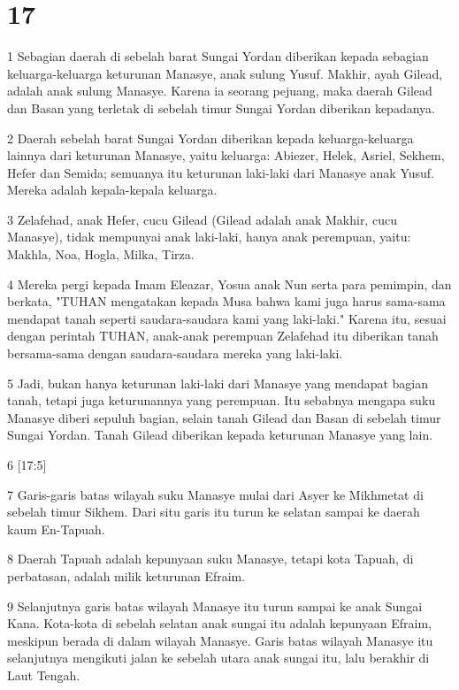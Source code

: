 \chapter{17}

\par 1 Sebagian daerah di sebelah barat Sungai Yordan diberikan kepada sebagian keluarga-keluarga keturunan Manasye, anak sulung Yusuf. Makhir, ayah Gilead, adalah anak sulung Manasye. Karena ia seorang pejuang, maka daerah Gilead dan Basan yang terletak di sebelah timur Sungai Yordan diberikan kepadanya.
\par 2 Daerah sebelah barat Sungai Yordan diberikan kepada keluarga-keluarga lainnya dari keturunan Manasye, yaitu keluarga: Abiezer, Helek, Asriel, Sekhem, Hefer dan Semida; semuanya itu keturunan laki-laki dari Manasye anak Yusuf. Mereka adalah kepala-kepala keluarga.
\par 3 Zelafehad, anak Hefer, cucu Gilead (Gilead adalah anak Makhir, cucu Manasye), tidak mempunyai anak laki-laki, hanya anak perempuan, yaitu: Makhla, Noa, Hogla, Milka, Tirza.
\par 4 Mereka pergi kepada Imam Eleazar, Yosua anak Nun serta para pemimpin, dan berkata, "TUHAN mengatakan kepada Musa bahwa kami juga harus sama-sama mendapat tanah seperti saudara-saudara kami yang laki-laki." Karena itu, sesuai dengan perintah TUHAN, anak-anak perempuan Zelafehad itu diberikan tanah bersama-sama dengan saudara-saudara mereka yang laki-laki.
\par 5 Jadi, bukan hanya keturunan laki-laki dari Manasye yang mendapat bagian tanah, tetapi juga keturunannya yang perempuan. Itu sebabnya mengapa suku Manasye diberi sepuluh bagian, selain tanah Gilead dan Basan di sebelah timur Sungai Yordan. Tanah Gilead diberikan kepada keturunan Manasye yang lain.
\par 6 [17:5]
\par 7 Garis-garis batas wilayah suku Manasye mulai dari Asyer ke Mikhmetat di sebelah timur Sikhem. Dari situ garis itu turun ke selatan sampai ke daerah kaum En-Tapuah.
\par 8 Daerah Tapuah adalah kepunyaan suku Manasye, tetapi kota Tapuah, di perbatasan, adalah milik keturunan Efraim.
\par 9 Selanjutnya garis batas wilayah Manasye itu turun sampai ke anak Sungai Kana. Kota-kota di sebelah selatan anak sungai itu adalah kepunyaan Efraim, meskipun berada di dalam wilayah Manasye. Garis batas wilayah Manasye itu selanjutnya mengikuti jalan ke sebelah utara anak sungai itu, lalu berakhir di Laut Tengah.
